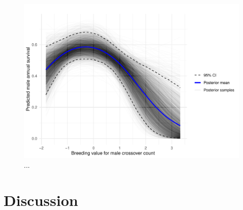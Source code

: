 \documentclass[dvipsnames]{article}
\begin{document}
\begin{figure}
    \centering
    \includegraphics[width=0.91\linewidth]{figs/surv_bv_pred_m.pdf}
    \caption{...}
    \label{fig-surv_bv_m}
\end{figure}

\section*{Discussion}
\end{document}

